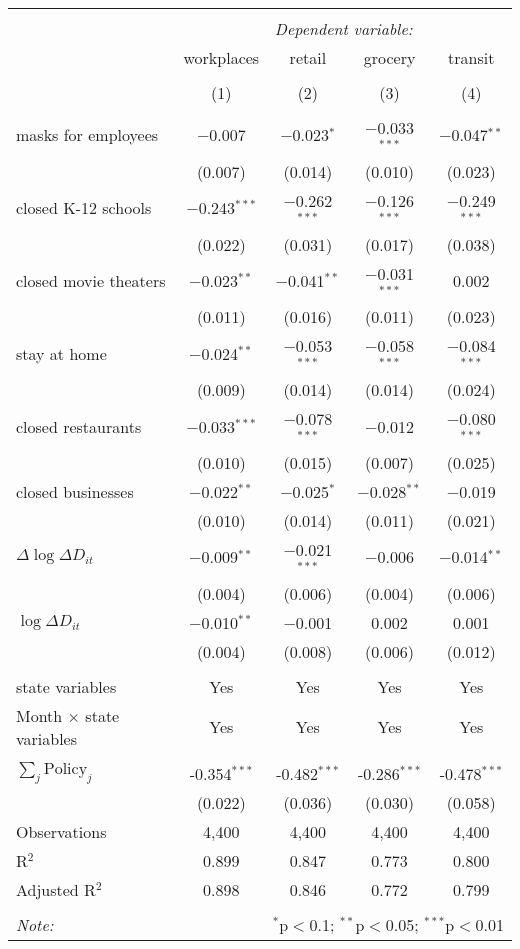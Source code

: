 \begin{tabular}{@{\extracolsep{1pt}}lcccc} 
\\[-1.8ex]\hline 
\hline \\[-1.8ex] 
 & \multicolumn{4}{c}{\textit{Dependent variable:}} \\ 
\cline{2-5} 
 & workplaces & retail & grocery & transit \\ 
\\[-1.8ex] & (1) & (2) & (3) & (4)\\ 
\hline \\[-1.8ex] 
 masks for employees & $-$0.007 & $-$0.023$^{*}$ & $-$0.033$^{***}$ & $-$0.047$^{**}$ \\ 
  & (0.007) & (0.014) & (0.010) & (0.023) \\ 
  closed K-12 schools & $-$0.243$^{***}$ & $-$0.262$^{***}$ & $-$0.126$^{***}$ & $-$0.249$^{***}$ \\ 
  & (0.022) & (0.031) & (0.017) & (0.038) \\ 
  closed movie theaters & $-$0.023$^{**}$ & $-$0.041$^{**}$ & $-$0.031$^{***}$ & 0.002 \\ 
  & (0.011) & (0.016) & (0.011) & (0.023) \\ 
  stay at home & $-$0.024$^{**}$ & $-$0.053$^{***}$ & $-$0.058$^{***}$ & $-$0.084$^{***}$ \\ 
  & (0.009) & (0.014) & (0.014) & (0.024) \\ 
  closed restaurants & $-$0.033$^{***}$ & $-$0.078$^{***}$ & $-$0.012 & $-$0.080$^{***}$ \\ 
  & (0.010) & (0.015) & (0.007) & (0.025) \\ 
  closed businesses & $-$0.022$^{**}$ & $-$0.025$^{*}$ & $-$0.028$^{**}$ & $-$0.019 \\ 
  & (0.010) & (0.014) & (0.011) & (0.021) \\ 
  $\Delta \log \Delta D_{it}$ & $-$0.009$^{**}$ & $-$0.021$^{***}$ & $-$0.006 & $-$0.014$^{**}$ \\ 
  & (0.004) & (0.006) & (0.004) & (0.006) \\ 
  $\log \Delta D_{it}$ & $-$0.010$^{**}$ & $-$0.001 & 0.002 & 0.001 \\ 
  & (0.004) & (0.008) & (0.006) & (0.012) \\ 
 \hline \\[-1.8ex] 
state variables & Yes & Yes & Yes & Yes \\ 
Month $\times$ state variables & Yes & Yes & Yes & Yes \\ 
\hline \\[-1.8ex] 
$\sum_j \mathrm{Policy}_j$ & -0.354$^{***}$ & -0.482$^{***}$ & -0.286$^{***}$ & -0.478$^{***}$ \\ 
 & (0.022) & (0.036) & (0.030) & (0.058) \\ 
Observations & 4,400 & 4,400 & 4,400 & 4,400 \\ 
R$^{2}$ & 0.899 & 0.847 & 0.773 & 0.800 \\ 
Adjusted R$^{2}$ & 0.898 & 0.846 & 0.772 & 0.799 \\ 
\hline 
\hline \\[-1.8ex] 
\textit{Note:}  & \multicolumn{4}{r}{$^{*}$p$<$0.1; $^{**}$p$<$0.05; $^{***}$p$<$0.01} \\ 
\end{tabular} 